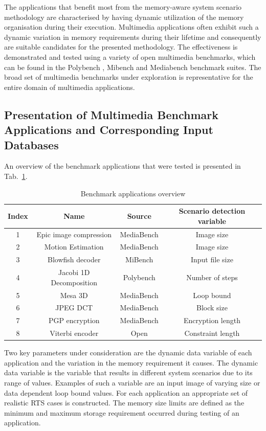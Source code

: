 \documentclass[smallcondensed]{svjour3}
\begin{document}
The applications that benefit most from the memory-aware system scenario methodology are characterised by having dynamic utilization of the memory organisation during their execution. 
Multimedia applications often exhibit such a dynamic variation in memory requirements during their lifetime and consequently are suitable candidates for the presented methodology.
The effectiveness is demonstrated and tested using a variety of open multimedia benchmarks, which can be found in the Polybench \cite{Poly}, Mibench \cite{mibench} and Mediabench \cite{mediabench} benchmark suites.
The broad set of multimedia benchmarks under exploration is representative for the entire domain of multimedia applications. 

\subsection{Presentation of Multimedia Benchmark Applications and Corresponding Input Databases}

An overview of the benchmark applications that were tested is presented in Tab.~\ref{tab:app1}. 

\begin{table}
\caption{Benchmark applications overview}
\label{tab:app1}
{
\begin{tabular}{|c|c|c|c|}
\hline
\textbf{Index} & \textbf{Name} & \textbf{Source} & \textbf{Scenario detection variable}\\ 
\hline 
1 & Epic image compression & MediaBench & Image size \\ 
\hline 
2 & Motion Estimation & MediaBench 	& Image size \\ 
\hline 
3 & Blowfish decoder & MiBench & Input file size \\ 
\hline 
4 & Jacobi 1D Decomposition & Polybench & Number of steps \\ 
\hline 
5 & Mesa 3D & MediaBench & Loop bound \\ 
\hline 
6 & JPEG DCT & MediaBench & Block size \\ 
\hline 
7 & PGP encryption & MediaBench & Encryption length \\ 
\hline 
8 & Viterbi encoder & Open & Constraint length \\ 
\hline 
\end{tabular}}
\end{table}

Two key parameters under consideration are the dynamic data variable of each application and the variation in the memory requirement it causes. 
The dynamic data variable is the variable that results in different system scenarios due to its range of values. 
Examples of such a variable are an input image of varying size or data dependent loop bound values. 
For each application an appropriate set of realistic RTS cases is constructed. 
The memory size limits are defined as the minimum and maximum storage requirement occurred during testing of an application.
\end{document}
